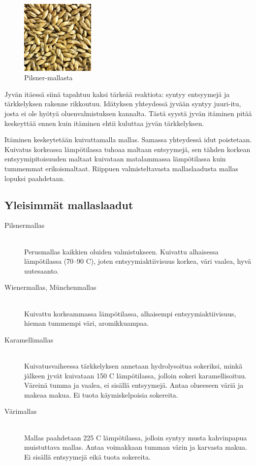 \documentclass[a4paper,11pt]{report}
\begin{document}
\begin{figure}
  \begin{center}
    \includegraphics[width=0.32\textwidth]{pilsnermalt}
    \caption{Pilsner-mallasta}
  \end{center}
  \end{figure}
Jyvän itäessä siinä tapahtuu kaksi tärkeää reaktiota: syntyy entsyymejä ja tärkkelyksen rakenne rikkoutuu. Idätyksen yhteydessä jyvään syntyy juuri-itu, josta ei ole hyötyä oluenvalmistuksen kannalta. Tästä syystä jyvän itäminen pitää keskeyttää ennen kuin itäminen ehtii kuluttaa jyvän tärkkelyksen.

Itäminen keskeytetään kuivattamalla mallas. Samassa yhteydessä idut poistetaan. Kuivatus korkeassa lämpötilassa tuhoaa maltaan entsyymejä, sen tähden korkean entsyymipitoisuuden maltaat kuivataan matalammassa lämpötilassa kuin tummemmat erikoismaltaat. Riippuen valmisteltavasta mallaslaadusta mallas lopuksi paahdetaan.

\subsection{Yleisimmät mallaslaadut}

\begin{description}
\item[Pilsnermallas] \hfill \\
Perusmallas kaikkien oluiden valmistukseen. Kuivattu alhaisessa lämpötilassa (70--90 \degree C), joten entsyymiaktiivisuus korkea, väri vaalea, hyvä uutesaanto.
\item[Wienermallas, Münchenmallas] \hfill \\
Kuivattu korkeammassa lämpötilassa, alhaisempi entsyymiaktiivisuus, hieman tummempi väri, aromikkuampaa.
\item[Karamellimallas] \hfill \\
Kuivatusvaiheessa tärkkelyksen annetaan hydrolysoitua sokeriksi, minkä jälkeen jyvät kuivataan 150 \degree C lämpötilassa, jolloin sokeri karamellisoituu. Väreinä tumma ja vaalea, ei sisällä entsyymejä. Antaa olueeseen väriä ja makeaa makua. Ei tuota käymiskelpoisia sokereita.
\item[Värimallas] \hfill \\
Mallas paahdetaan 225 \degree C lämpötilassa, jolloin syntyy musta kahvinpapua muistuttava mallas. Antaa voimakkaan tumman värin ja karvasta makua. Ei sisällä entsyymejä eikä tuota sokereita.
\end{description}
\end{document}
